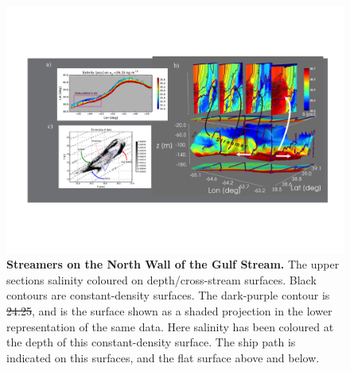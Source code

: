 \documentclass{ametsoc}
\begin{document}
\begin{figure}[htbp]
  \centering
    \includegraphics[width=\textwidth]{./ThreeDSectionDAnnotate.pdf}
   \caption{{\bf Streamers on the North Wall of the Gulf Stream.}  The upper sections salinity coloured on depth/cross-stream surfaces.  Black contours are constant-density surfaces. The dark-purple contour is \st{24.25}, and is the surface shown as a shaded projection in the lower representation of the same data.  Here salinity has been coloured at the depth of this constant-density surface.  The ship path is indicated on this surfaces, and the flat surface above and below.  
         }\label{fig:ThreeDSectionDAnnotate} 
 
\end{figure}





 
 
\end{document}
